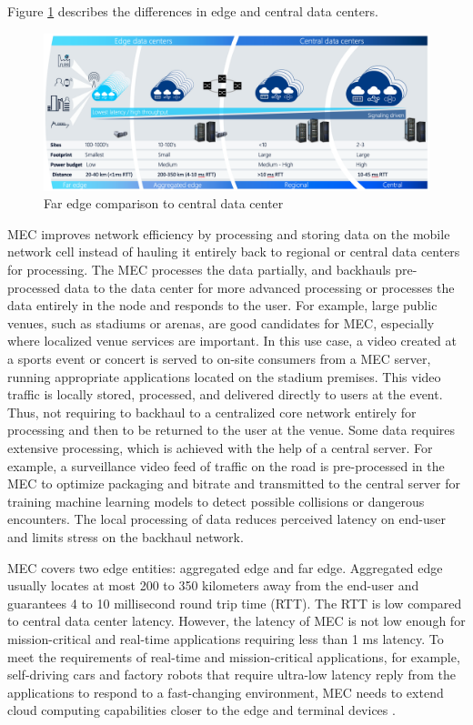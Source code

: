 Figure \ref{fig:AirFrame} describes the differences in edge and central data centers.

\begin{figure}[ht]
  \begin{center}
    \includegraphics[width=13.5cm]{images/AirFrame.png}
    \caption{Far edge comparison to central data center \cite{AirFrameOpenEdgeServer}}
    \label{fig:AirFrame}
  \end{center}
\end{figure}

MEC improves network efficiency by processing and storing data on the mobile network cell instead of hauling it entirely back to regional or central data centers for processing. The MEC processes the data partially, and backhauls pre-processed data to the data center for more advanced processing or processes the data entirely in the node and responds to the user. For example, large public venues, such as stadiums or arenas, are good candidates for MEC, especially where localized venue services are important. In this use case, a video created at a sports event or concert is served to on-site consumers from a MEC server, running appropriate applications located on the stadium premises. This video traffic is locally stored, processed, and delivered directly to users at the event. Thus, not requiring to backhaul to a centralized core network entirely for processing and then to be returned to the user at the venue. Some data requires extensive processing, which is achieved with the help of a central server. For example, a surveillance video feed of traffic on the road is pre-processed in the MEC to optimize packaging and bitrate and transmitted to the central server for training machine learning models to detect possible collisions or dangerous encounters. The local processing of data reduces perceived latency on end-user and limits stress on the backhaul network. \cite{Brown2016}

MEC covers two edge entities: aggregated edge and far edge. Aggregated edge usually locates at most 200 to 350 kilometers away from the end-user and guarantees 4 to 10 millisecond round trip time (RTT). The RTT is low compared to central data center latency. However, the latency of MEC is not low enough for mission-critical and real-time applications requiring less than 1 ms latency. To meet the requirements of real-time and mission-critical applications, for example, self-driving cars and factory robots that require ultra-low latency reply from the applications to respond to a fast-changing environment, MEC needs to extend cloud computing capabilities closer to the edge and terminal devices \cite{Ning2019}.

